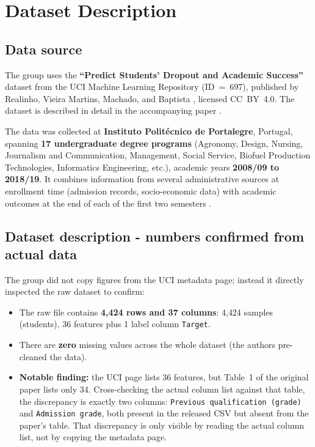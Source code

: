 
\section{Dataset Description}
\label{sec:c}

\subsection{Data source}

The group uses the \textbf{``Predict Students' Dropout and Academic
Success''} dataset from the UCI Machine Learning Repository (ID~=~697),
published by Realinho, Vieira Martins, Machado, and Baptista
\citep{realinho2021dataset}, licensed CC~BY~4.0. The dataset is described
in detail in the accompanying paper \citep{realinho2022predicting}.

The data was collected at \textbf{Instituto Polit\'ecnico de Portalegre},
Portugal, spanning \textbf{17 undergraduate degree programs} (Agronomy,
Design, Nursing, Journalism and Communication, Management, Social
Service, Biofuel Production Technologies, Informatics Engineering, etc.),
academic years \textbf{2008/09 to 2018/19}. It combines information from
several administrative sources at enrollment time (admission records,
socio-economic data) with academic outcomes at the end of each of the
first two semesters \citep[Section~2, ``Data Description'']{realinho2022predicting}.

\subsection{Dataset description - numbers confirmed from actual data}

The group did not copy figures from the UCI metadata page; instead it
directly inspected the raw dataset to confirm:

\begin{itemize}
  \item The raw file contains \textbf{4,424 rows and 37 columns}: 4{,}424
    samples (students), 36 features plus 1 label column \texttt{Target}.
  \item There are \textbf{zero} missing values across the whole dataset
    (the authors pre-cleaned the data).
  \item \textbf{Notable finding:} the UCI page lists 36 features, but
    Table~1 of the original paper lists only 34. Cross-checking the
    actual column list against that table, the discrepancy is exactly
    two columns: \texttt{Previous qualification (grade)} and
    \texttt{Admission grade}, both present in the released CSV but absent
    from the paper's table. That discrepancy is only visible by reading
    the actual column list, not by copying the metadata page.
\end{itemize}

